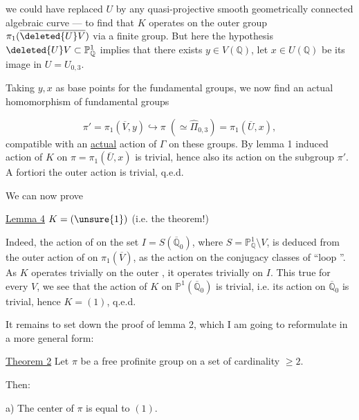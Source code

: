 \unsure{(} we could have replaced $U$ by any quasi-projective smooth geometrically connected algebraic curve --- to find that $K$ operates on the outer group $\pi_1(\overline{\deleted{U}V})$ via a finite group. But here the hypothesis $\deleted{U}V\subset\mathbb P^1_{\mathbb Q}$ implies that there exists $y\in V(\mathbb Q)$, let $x\in U(\mathbb Q)$ be its image in $U=U_{0,3}$.

Taking  $y,x$ as base points for the fundamental groups, we now find an actual homomorphism of fundamental groups


\[
\pi'=\pi_1(\overline V,y)\hookrightarrow
\pi\;(\simeq\widehat{\Pi}_{0,3})=\pi_1(\overline U,x),
\]
compatible with an \uline{actual} action of $\Gamma$ on these groups. By lemma 1
 induced action of $K$ on $\pi=\pi_1(\overline U,x)$ is trivial,
hence also its action on the subgroup $\pi'$. A fortiori the outer action is trivial, q.e.d.

We can now prove

\uline{Lemma 4} $K=(\unsure{1})$ (i.e. the theorem!)

Indeed,  the action of
\deleted{\unsure{$\Gamma$}} on the set
$I=S(\overline{\mathbb Q}_0)$, where $S=\mathbb P^1_{\mathbb Q}\setminus V$,
is deduced from the outer action of
\deleted{\unsure{$\Gamma$}} on $\pi_1(\overline V)$,
 as the action on the conjugacy classes of
``loop ''. As $K$ operates trivially on the outer ,
it operates trivially on $I$. This  true for every $V$, we see that the action of $K$
on $\mathbb P^1(\overline{\mathbb Q}_0)$
is trivial, i.e. its action on $\overline{\mathbb Q}_0$ is trivial,
hence $K=(1)$, q.e.d.



It remains to set down the proof of lemma 2, which I am going to reformulate in a more general form:

\uline{Theorem 2} Let $\pi$ be a free profinite group on a set  of cardinality $\geq 2$.

Then:

a) The center of $\pi$ is  equal to $(1)$.

